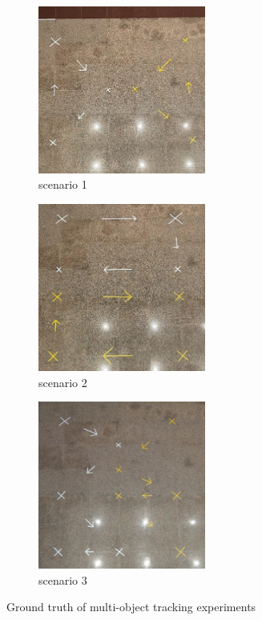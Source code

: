\begin{figure}[hbpt]
    \centering
    \begin{subfigure}{0.25\linewidth}
        \includegraphics[width=5.5cm]{Figures/scenario_1_gt.png}
        \caption{scenario 1}
        \label{subfig:scenario1gt}
    \end{subfigure}
    \hfill
    \begin{subfigure}{0.25\linewidth}
        \centering
        \includegraphics[width=5.5cm]{Figures/scenario_2_gt.png}
        \caption{scenario 2}
        \label{subfig:scenario2gt}
    \end{subfigure}
    \hfill
    \begin{subfigure}{0.25\linewidth}
        \centering
        \includegraphics[width=5.5cm]{Figures/scenario_3_gt.jpg}
        \caption{scenario 3}
        \label{subfig:scenario3gt}
    \end{subfigure}

    \caption{Ground truth of multi-object tracking experiments}
    \label{fig:ground_truth}
\end{figure}

